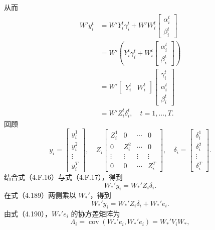 从而
\begin{equation}
\begin{aligned}
W'y_i^t
&=W'Y_i^t\gamma_i^t+W'W_i^t\begin{bmatrix}\alpha_i^t\\\beta_i^t\end{bmatrix}\\
&=W'\left(Y_i^t\gamma_i^t+W_i^t\begin{bmatrix}\alpha_i^t\\\beta_i^t\end{bmatrix}\right)\\
&=W'\begin{bmatrix}Y_i^t&W_i^t\end{bmatrix}
 \begin{bmatrix}\gamma_i^t\\\alpha_i^t\\\beta_i^t\end{bmatrix}\\
&=W'Z_i^t\delta_i^t,\quad t=1,\ldots,T.
\end{aligned}\tag{4.F.16}
\end{equation}
回顾
\begin{equation}
y_i=\begin{bmatrix}y_i^1\\y_i^2\\\vdots\\y_i^T\end{bmatrix},\quad
Z_i\begin{bmatrix}
Z_i^1&0&\cdots&0\\0&Z_i^2&\cdots&0\\
\vdots&\vdots&\vdots&\vdots\\0&0&\cdots&Z_i^T
\end{bmatrix},\quad
\delta_i=\begin{bmatrix}\delta_i^1\\\delta_i^2\\\vdots\\\delta_i^T\end{bmatrix}.\tag{4.F.17}
\end{equation}
结合式（4.F.16）与式（4.F.17），得到
\begin{equation}
W_*'y_i=W_*'Z_i\delta_i.\tag{4.F.18}
\end{equation}
在式（4.189）两侧乘以 $W_*'$，得到
\begin{equation}
W_*'y_i=W_*'Z_i\delta_i+W_*'e_i.\tag{4.F.19}
\end{equation}
由式（4.190），$W_*'e_i$ 的协方差矩阵为
\begin{equation}
\Lambda_i=\operatorname{cov}(W_*'e_i,W_*'e_i)=W_*'V_iW_*,\tag{4.F.20}
\end{equation}
